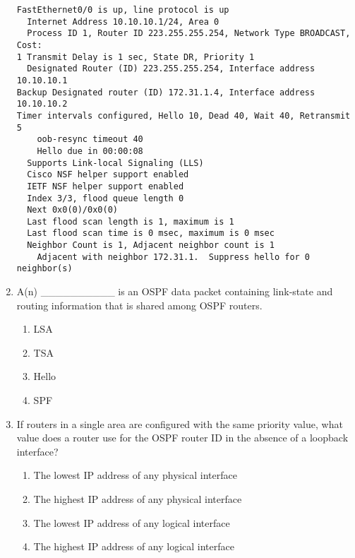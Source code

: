 \begin{enumerate}
\begin{verbatim}
FastEthernet0/0 is up, line protocol is up
  Internet Address 10.10.10.1/24, Area 0
  Process ID 1, Router ID 223.255.255.254, Network Type BROADCAST, Cost: 
1 Transmit Delay is 1 sec, State DR, Priority 1
  Designated Router (ID) 223.255.255.254, Interface address 10.10.10.1
Backup Designated router (ID) 172.31.1.4, Interface address 10.10.10.2
Timer intervals configured, Hello 10, Dead 40, Wait 40, Retransmit 5
    oob-resync timeout 40
    Hello due in 00:00:08
  Supports Link-local Signaling (LLS)
  Cisco NSF helper support enabled
  IETF NSF helper support enabled
  Index 3/3, flood queue length 0
  Next 0x0(0)/0x0(0)
  Last flood scan length is 1, maximum is 1
  Last flood scan time is 0 msec, maximum is 0 msec
  Neighbor Count is 1, Adjacent neighbor count is 1
    Adjacent with neighbor 172.31.1.  Suppress hello for 0 neighbor(s)
\end{verbatim}
\item
  A(n) \_\_\_\_\_\_\_\_\_\_ is an OSPF data packet containing link-state
  and routing information that is shared among OSPF routers.

  \begin{enumerate}
  \def\labelenumii{\Alph{enumii}.}
  \tightlist
  \item
    LSA
  \item
    TSA
  \item
    Hello
  \item
    SPF
  \end{enumerate}
\item
  If routers in a single area are configured with the same priority
  value, what value does a router use for the OSPF router ID in the
  absence of a loopback interface?

  \begin{enumerate}
  \def\labelenumii{\Alph{enumii}.}
  \tightlist
  \item
    The lowest IP address of any physical interface
  \item
    The highest IP address of any physical interface
  \item
    The lowest IP address of any logical interface
  \item
    The highest IP address of any logical interface
  \end{enumerate}
\end{enumerate}
